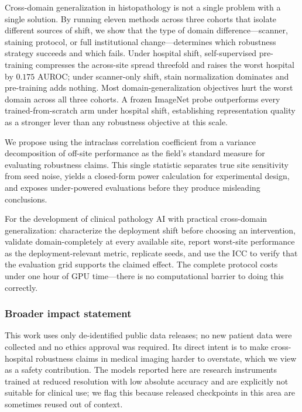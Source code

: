 \documentclass[10pt]{article} %
\begin{document}
Cross-domain generalization in histopathology is not a single problem with a
single solution. By running eleven methods across three cohorts that isolate
different sources of shift, we show that the type of domain
difference---scanner, staining protocol, or full institutional change---determines
which robustness strategy succeeds and which fails. Under hospital shift,
self-supervised pre-training compresses the across-site spread threefold and
raises the worst hospital by $0.175$ AUROC; under scanner-only shift, stain
normalization dominates and pre-training adds nothing. Most
domain-generalization objectives hurt the worst domain across all three
cohorts. A frozen ImageNet probe outperforms every trained-from-scratch arm
under hospital shift, establishing representation quality as a stronger lever
than any robustness objective at this scale.

We propose using the intraclass correlation coefficient from a variance
decomposition of off-site performance as the field's standard measure for
evaluating robustness claims. This single statistic separates true site
sensitivity from seed noise, yields a closed-form power calculation for
experimental design, and exposes under-powered evaluations before they produce
misleading conclusions.

For the development of clinical pathology AI with practical cross-domain
generalization: characterize the deployment shift before choosing an
intervention, validate domain-completely at every available site, report
worst-site performance as the deployment-relevant metric, replicate seeds, and
use the ICC to verify that the evaluation grid supports the claimed effect. The
complete protocol costs under one hour of GPU time---there is no computational
barrier to doing this correctly.

\subsubsection*{Broader impact statement}

This work uses only de-identified public data releases; no new patient data
were collected and no ethics approval was required. Its direct intent is to
make cross-hospital robustness claims in medical imaging harder to overstate,
which we view as a safety contribution. The models reported here are research
instruments trained at reduced resolution with low absolute accuracy and are
explicitly not suitable for clinical use; we flag this because released
checkpoints in this area are sometimes reused out of context.
\end{document}

